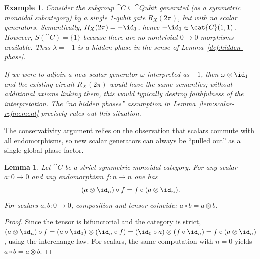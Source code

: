 \documentclass[10pt,a4paper]{article}
\newtheorem{lemma}[theorem]{Lemma}
\newtheorem{example}[theorem]{Example}
\def\cref#1{Lemma~\ref{#1}}%
\begin{document}
\begin{example}\label{ex:hidden-phase}
Consider the subgroup $ \cat{C}\subseteq \cat{Qubit}$ generated (as a symmetric monoidal
subcategory) by a single 1-qubit gate $R_X(2\pi)$, but \emph{with no scalar generators}.
Semantically, $R_X(2\pi)=-\id_1$, hence $-\id_1\in \cat{C}(1,1)$.  However,
$S( \cat{C})=\{1\}$ because there are no nontrivial $0\to 0$ morphisms available.
Thus $\lambda=-1$ is a hidden phase in the sense of \cref{def:hidden-phase}.

If we were to adjoin a new scalar generator $\omega$ interpreted as $-1$, then $\omega\otimes\id_1$
and the existing circuit $R_X(2\pi)$ would have the same semantics; without additional axioms
linking them, this would typically destroy faithfulness of the interpretation.  The ``no hidden phases''
assumption in \cref{lem:scalar-refinement} precisely rules out this situation.
\end{example}


The conservativity argument relies on the observation that scalars commute with all endomorphisms,
so new scalar generators can always be ``pulled out'' as a single global phase factor.

\begin{lemma}\label{lem:scalar-centrality}
Let $ \cat{C}$ be a strict symmetric monoidal category.  For any scalar $a:0\to 0$ and any
endomorphism $f:n\to n$ one has
\begin{equation}\label{eq:scalar-centrality-app}
  (a\otimes \id_n)\circ f = f\circ (a\otimes \id_n).
\end{equation}
For scalars $a,b:0\to 0$, composition and tensor coincide:
\(
  a\circ b = a\otimes b.
\)
\end{lemma}
\begin{proof}
Since the tensor is bifunctorial and the category is strict,
\((a\otimes \id_n)\circ f
= (a\circ \id_0)\otimes(\id_n\circ f)
= (\id_0\circ a)\otimes(f\circ \id_n)
= f\circ(a\otimes \id_n)\), using the interchange law.
For scalars, the same computation with $n=0$ yields $a \circ b = a \otimes b$.
\end{proof}

\end{document}
